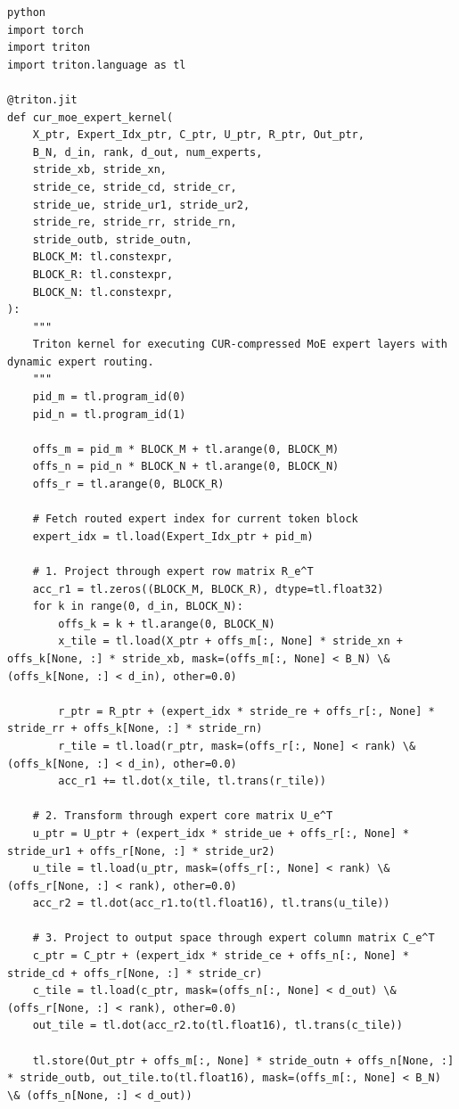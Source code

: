 \vspace{0.5em}
\begin{mdframed}[backgroundcolor=codebg, linecolor=codeframe, linewidth=1pt, roundcorner=4pt, innerleftmargin=2pt, innerrightmargin=5pt, innertopmargin=5pt, innerbottommargin=5pt]
\begin{lstlisting}
python
import torch
import triton
import triton.language as tl

@triton.jit
def cur_moe_expert_kernel(
    X_ptr, Expert_Idx_ptr, C_ptr, U_ptr, R_ptr, Out_ptr,
    B_N, d_in, rank, d_out, num_experts,
    stride_xb, stride_xn,
    stride_ce, stride_cd, stride_cr,
    stride_ue, stride_ur1, stride_ur2,
    stride_re, stride_rr, stride_rn,
    stride_outb, stride_outn,
    BLOCK_M: tl.constexpr,
    BLOCK_R: tl.constexpr,
    BLOCK_N: tl.constexpr,
):
    """
    Triton kernel for executing CUR-compressed MoE expert layers with dynamic expert routing.
    """
    pid_m = tl.program_id(0)
    pid_n = tl.program_id(1)

    offs_m = pid_m * BLOCK_M + tl.arange(0, BLOCK_M)
    offs_n = pid_n * BLOCK_N + tl.arange(0, BLOCK_N)
    offs_r = tl.arange(0, BLOCK_R)

    # Fetch routed expert index for current token block
    expert_idx = tl.load(Expert_Idx_ptr + pid_m)

    # 1. Project through expert row matrix R_e^T
    acc_r1 = tl.zeros((BLOCK_M, BLOCK_R), dtype=tl.float32)
    for k in range(0, d_in, BLOCK_N):
        offs_k = k + tl.arange(0, BLOCK_N)
        x_tile = tl.load(X_ptr + offs_m[:, None] * stride_xn + offs_k[None, :] * stride_xb, mask=(offs_m[:, None] < B_N) \& (offs_k[None, :] < d_in), other=0.0)
        
        r_ptr = R_ptr + (expert_idx * stride_re + offs_r[:, None] * stride_rr + offs_k[None, :] * stride_rn)
        r_tile = tl.load(r_ptr, mask=(offs_r[:, None] < rank) \& (offs_k[None, :] < d_in), other=0.0)
        acc_r1 += tl.dot(x_tile, tl.trans(r_tile))

    # 2. Transform through expert core matrix U_e^T
    u_ptr = U_ptr + (expert_idx * stride_ue + offs_r[:, None] * stride_ur1 + offs_r[None, :] * stride_ur2)
    u_tile = tl.load(u_ptr, mask=(offs_r[:, None] < rank) \& (offs_r[None, :] < rank), other=0.0)
    acc_r2 = tl.dot(acc_r1.to(tl.float16), tl.trans(u_tile))

    # 3. Project to output space through expert column matrix C_e^T
    c_ptr = C_ptr + (expert_idx * stride_ce + offs_n[:, None] * stride_cd + offs_r[None, :] * stride_cr)
    c_tile = tl.load(c_ptr, mask=(offs_n[:, None] < d_out) \& (offs_r[None, :] < rank), other=0.0)
    out_tile = tl.dot(acc_r2.to(tl.float16), tl.trans(c_tile))

    tl.store(Out_ptr + offs_m[:, None] * stride_outn + offs_n[None, :] * stride_outb, out_tile.to(tl.float16), mask=(offs_m[:, None] < B_N) \& (offs_n[None, :] < d_out))
\end{lstlisting}
\end{mdframed}
\vspace{0.5em}



